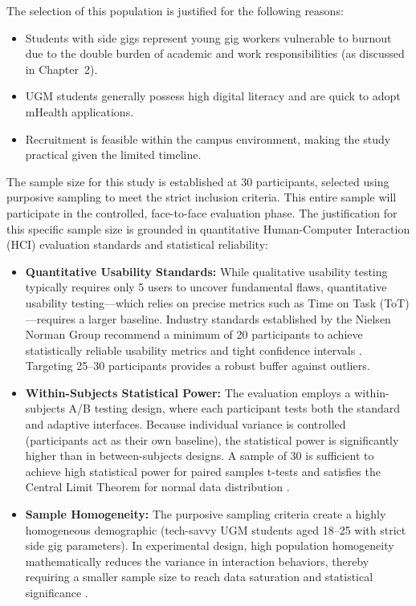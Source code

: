 The selection of this population is justified for the following reasons:

\begin{itemize}
    \item Students with side gigs represent young gig workers vulnerable to burnout due to the double burden of academic and work responsibilities (as discussed in Chapter~2).
    \item UGM students generally possess high digital literacy and are quick to adopt mHealth applications.
    \item Recruitment is feasible within the campus environment, making the study practical given the limited timeline.
\end{itemize}

The sample size for this study is established at 30 participants, selected using purposive sampling to meet the strict inclusion criteria. This entire sample will participate in the controlled, face-to-face evaluation phase. The justification for this specific sample size is grounded in quantitative Human-Computer Interaction (HCI) evaluation standards and statistical reliability:

\begin{itemize}
    \item \textbf{Quantitative Usability Standards:} While qualitative usability testing typically requires only 5 users to uncover fundamental flaws, quantitative usability testing---which relies on precise metrics such as Time on Task (ToT)---requires a larger baseline. Industry standards established by the Nielsen Norman Group recommend a minimum of 20 participants to achieve statistically reliable usability metrics and tight confidence intervals \cite{nielsen2006quantitative}. Targeting 25--30 participants provides a robust buffer against outliers.
    \item \textbf{Within-Subjects Statistical Power:} The evaluation employs a within-subjects A/B testing design, where each participant tests both the standard and adaptive interfaces. Because individual variance is controlled (participants act as their own baseline), the statistical power is significantly higher than in between-subjects designs. A sample of 30 is sufficient to achieve high statistical power for paired samples t-tests and satisfies the Central Limit Theorem for normal data distribution \cite{field2013statistics}.
    \item \textbf{Sample Homogeneity:} The purposive sampling criteria create a highly homogeneous demographic (tech-savvy UGM students aged 18--25 with strict side gig parameters). In experimental design, high population homogeneity mathematically reduces the variance in interaction behaviors, thereby requiring a smaller sample size to reach data saturation and statistical significance \cite{macefield2009sample}.
\end{itemize}

